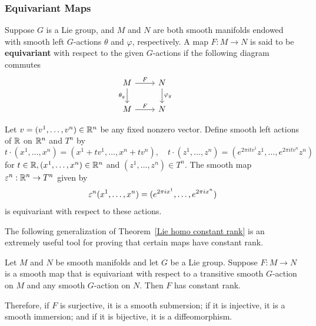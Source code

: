 \subsubsection{Equivariant Maps}
Suppose $G$ is a Lie group, and $M$ and $N$ are both smooth manifolds endowed with smooth left $G$-actions $\theta$ and $\varphi$, respectively. A map $F:M\to N$ is said to be \textbf{equivariant} with respect to the given $G$-actions if the following diagram commutes
\[\begin{tikzcd}
M\ar[r,"F"]\ar[d,swap,"\theta_g"]&N\ar[d,"\varphi_g"]&\\
M\ar[r,"F"]&N
\end{tikzcd}\]
\begin{example}
Let $v=(v^1,\dots,v^n)\in\mathbb{R}^n$ be any fixed nonzero vector. Define smooth left actions of $\mathbb{R}$ on $\mathbb{R}^n$ and $T^n$ by
\[t\cdot(x^1,\dots,x^n)=(x^1+tv^1,\dots,x^n+tv^n),\quad t\cdot(z^1,\dots,z^n)=(e^{2\pi itv^1}z^1,\dots,e^{2\pi itv^n}z^n)\]
for $t\in\mathbb{R},(x^1,\dots,x^n)\in\mathbb{R}^n$ and $(z^1,\dots,z^n)\in T^n$. The smooth map $\varepsilon^n:\mathbb{R}^n\to T^n$ given by
\[\varepsilon^n(x^1,\dots,x^n)=(e^{2\pi ix^1},\dots,e^{2\pi ix^n})\]
is equivariant with respect to these actions.
\end{example}
The following generalization of Theorem~\ref{Lie homo constant rank} is an extremely useful tool for proving that certain maps have constant rank.
\begin{theorem}\label{Lie equivariant rank}
Let $M$ and $N$ be smooth manifolds and let $G$ be a Lie group. Suppose $F:M\to N$ is a smooth map that is equivariant with respect to a transitive smooth $G$-action on $M$ and any smooth $G$-action on $N$. Then $F$ has constant rank.\par 
Therefore, if $F$ is surjective, it is a smooth submersion; if it is injective, it is a smooth immersion; and if it is bijective, it is a diffeomorphism.
\end{theorem}
